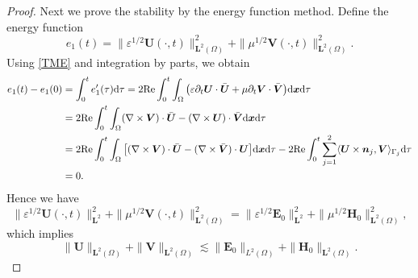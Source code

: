 \documentclass[11pt,reqno]{amsart}
\numberwithin{equation}{section}
\begin{document}
\begin{proof}
Next we prove the stability by the energy function method. Define the energy  function
\[
e_1 (t)=\| \varepsilon^{1/2}  \boldsymbol U (\cdot, t)\|^2_{\boldsymbol
L^2(\Omega)} +\|\mu ^{1/2} \boldsymbol V (\cdot, t)\|^2_{\boldsymbol L^2
(\Omega)}.
\]
Using \eqref {TME} and integration by parts, we obtain
\begin{align*}
e_1 (t) -e_1 (0)
&=\int_{0}^{t} e_1'(\tau) {\rm d} \tau= 2 {\rm Re} \int_0^t \int_{\Omega} \big(
\varepsilon \partial_t \boldsymbol U \cdot \bar {\boldsymbol U}+ \mu \partial_t
\boldsymbol V \cdot \bar {\boldsymbol V}\big ) {\rm d} \boldsymbol x {\rm d}
\tau\\
&= 2{\rm Re} \int_0^t \int_{\Omega} (\nabla \times \boldsymbol V) \cdot \bar
{\boldsymbol U} -(\nabla \times {\boldsymbol U}) \cdot \bar {\boldsymbol V} {\rm
d} \boldsymbol x {\rm d} \tau\\
&= 2{\rm Re } \int_0^ t \int_{\Omega} \big[(\nabla \times  {\boldsymbol V})
\cdot \bar {\boldsymbol U} -(\nabla \times \bar {\boldsymbol V}) \cdot 
{\boldsymbol U} \big] {\rm d} \boldsymbol x  {\rm d} \tau -2 {\rm Re} \int_0^{t}
 \sum \limits_{j=1}^2 \langle \boldsymbol U \times \boldsymbol n_j, {\boldsymbol
V} \rangle_{\Gamma_j} {\rm d} \tau \\
&=0.
\end{align*}
Hence we have
\[
\| \varepsilon ^{1/2} \boldsymbol U (\cdot, t)\|^2_{\boldsymbol L^2} +\|\mu
^{1/2} \boldsymbol V (\cdot, t)\|^2_{\boldsymbol L^2 (\Omega)}=
\| \varepsilon ^{1/2} \boldsymbol E_0\|^2_{\boldsymbol L^2} +\|\mu ^{1/2}
\boldsymbol H_0\|^2_{\boldsymbol L^2 (\Omega)},
\]
which implies
\[
\|\boldsymbol U\|_{\boldsymbol L^2 (\Omega)} +\| \boldsymbol V \|_{\boldsymbol L ^2 (\Omega)}
  \lesssim \|\boldsymbol E_0\|_{L^2 (\Omega)} +\|\boldsymbol H_0\|_{\boldsymbol L ^2 (\Omega)}.
\]


\end{proof}
\end{document}
